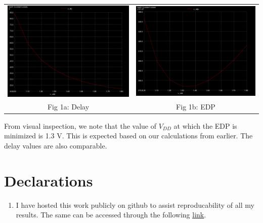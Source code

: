 \documentclass[12pt,a4paper]{article}
\begin{document}
\begin{center}
\begin{tabular}{cc}
     \includegraphics[width=0.49\linewidth]{tut3/reports/media/dly.png} &
     \includegraphics[width=0.49\linewidth]{tut3/reports/media/edp.png} \\
     Fig 1a: Delay & Fig 1b: EDP
\end{tabular}
\end{center}

\noindent From visual inspection, we note that the value of $V_{DD}$ at which the EDP is minimized is 1.3 V. This is expected based on our calculations from earlier. The delay values are also comparable.

\section{Declarations}
\begin{enumerate}
    \item I have hosted this work publicly on github to assist reproducability of all my results. The same can be accessed through the following \href{https://github.com/iamkarthikbk/ee5311-2025}{\underline{link}}.
\end{enumerate}
\end{document}
